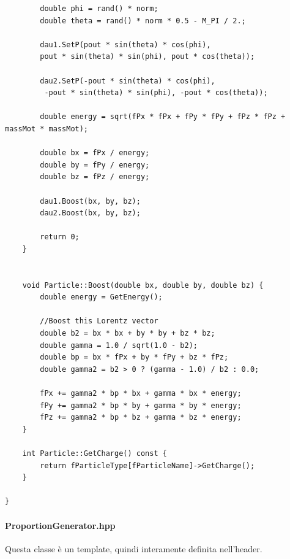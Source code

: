 \documentclass[12pt, a4paper]{article}
\begin{document}
\begin{verbatim}
        double phi = rand() * norm;
        double theta = rand() * norm * 0.5 - M_PI / 2.;
        
        dau1.SetP(pout * sin(theta) * cos(phi), 
        pout * sin(theta) * sin(phi), pout * cos(theta));
        
        dau2.SetP(-pout * sin(theta) * cos(phi),
         -pout * sin(theta) * sin(phi), -pout * cos(theta));

        double energy = sqrt(fPx * fPx + fPy * fPy + fPz * fPz + massMot * massMot);

        double bx = fPx / energy;
        double by = fPy / energy;
        double bz = fPz / energy;

        dau1.Boost(bx, by, bz);
        dau2.Boost(bx, by, bz);

        return 0;
    }


    void Particle::Boost(double bx, double by, double bz) {
        double energy = GetEnergy();

        //Boost this Lorentz vector
        double b2 = bx * bx + by * by + bz * bz;
        double gamma = 1.0 / sqrt(1.0 - b2);
        double bp = bx * fPx + by * fPy + bz * fPz;
        double gamma2 = b2 > 0 ? (gamma - 1.0) / b2 : 0.0;

        fPx += gamma2 * bp * bx + gamma * bx * energy;
        fPy += gamma2 * bp * by + gamma * by * energy;
        fPz += gamma2 * bp * bz + gamma * bz * energy;
    }

    int Particle::GetCharge() const {
        return fParticleType[fParticleName]->GetCharge();
    }

}
\end{verbatim}


\paragraph{ProportionGenerator.hpp}
Questa classe è un template, quindi interamente definita nell'header.
\end{document}
